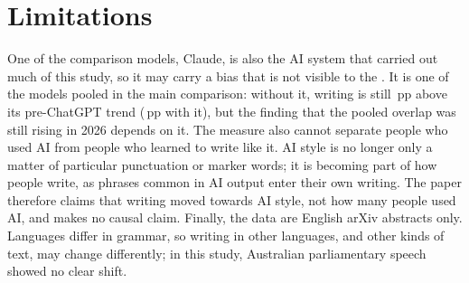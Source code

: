 \documentclass[11pt]{article}
\newcommand{\pp}{\,pp}
\begin{document}
\section*{Limitations}
One of the comparison models, Claude, is also the AI system that carried out much of this study, so it may carry a
bias that is not visible to the \theauthor{}. It is one of the  models pooled in
the main comparison: without it, writing is still \pp{} above its
pre-ChatGPT trend (\pp{} with it), but the finding that the pooled overlap was still
rising in 2026 depends on it. The measure also cannot separate people who used AI from people who learned to write
like it. AI style is no longer only a matter of particular punctuation or marker words; it is becoming part of how
people write, as phrases common in AI output enter their own writing. The paper therefore claims that writing moved
towards AI style, not how many people used AI, and makes no causal claim. Finally, the data are English arXiv
abstracts only. Languages differ in grammar, so writing in other languages, and other kinds of text, may change
differently; in this study, Australian parliamentary speech showed no clear shift.
\end{document}

